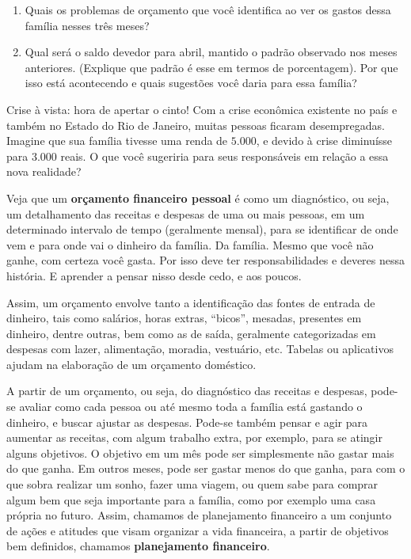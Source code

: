 \begin{enumerate}
\item Quais os problemas de orçamento que você identifica ao ver os gastos dessa família nesses três meses?
\item Qual será o saldo devedor para abril, mantido o padrão observado nos meses anteriores. (Explique que padrão é esse em termos de porcentagem). Por que isso está acontecendo e quais sugestões você daria para essa família?
\end{enumerate}

\begin{task}{Crise à vista: hora de apertar o cinto!}
Com a crise econômica existente no país e também no Estado do Rio de Janeiro, muitas pessoas ficaram desempregadas. Imagine que sua família tivesse uma renda de $5.000$, e devido à crise diminuísse para $3.000$ reais. O que você sugeriria para seus responsáveis em relação a essa nova realidade?
\end{task}


Veja que um \textbf{orçamento financeiro pessoal} é como um diagnóstico, ou seja, um detalhamento das receitas e despesas de uma ou mais pessoas, em um determinado intervalo de tempo (geralmente mensal), para se identificar de onde vem e para onde vai o dinheiro da família. Da família. Mesmo que você não ganhe, com certeza você gasta. Por isso deve ter responsabilidades e deveres nessa história. E aprender a pensar nisso desde cedo, e aos poucos.

Assim, um orçamento envolve tanto a identificação das fontes de entrada de dinheiro, tais como salários, horas extras, “bicos”, mesadas, presentes em dinheiro, dentre outras, bem como as de saída, geralmente categorizadas em despesas com lazer, alimentação, moradia, vestuário, etc. Tabelas ou aplicativos ajudam na elaboração de um orçamento doméstico.

A partir de um orçamento, ou seja, do diagnóstico das receitas e despesas, pode-se avaliar como cada pessoa ou até mesmo toda a família está gastando o dinheiro, e buscar ajustar as despesas. Pode-se também pensar e agir para aumentar as receitas, com algum trabalho extra, por exemplo, para se atingir alguns objetivos. O objetivo em um mês pode ser simplesmente não gastar mais do que ganha. Em outros meses, pode ser gastar menos do que ganha, para com o que sobra realizar um sonho, fazer uma viagem, ou quem sabe para comprar algum bem que seja importante para a família, como por exemplo uma casa própria no futuro. Assim, chamamos de planejamento financeiro a um conjunto de ações e atitudes que visam organizar a vida financeira, a partir de objetivos bem definidos, chamamos \textbf{planejamento financeiro}. 

